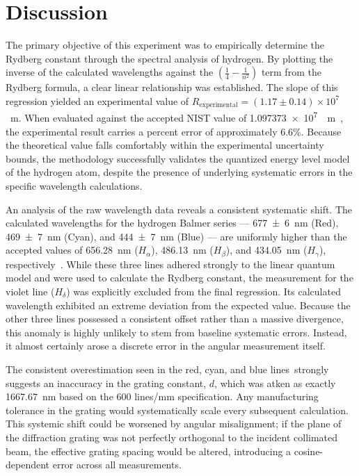 \documentclass[11pt]{article}
\begin{document}
    \newpage
    \section{Discussion}\label{sec:discussion}

        The primary objective of this experiment was to empirically determine
        the Rydberg constant through the spectral analysis of hydrogen.
        By plotting the inverse of the calculated wavelengths against the
        \(\left( \frac{1}{4} - \frac{1}{n^2} \right)\) term from the Rydberg
        formula, a clear linear relationship was established.
        The slope of this regression yielded an experimental value of
        \( R_{\text{experimental}} = (1.17 \pm 0.14) \times 10^7\)
        \si{\per\meter}.
        When evaluated against the accepted NIST value of
        \SI{1.097373e7}{\per\meter}~\cite{nist_rydberg}, the experimental
        result carries a percent error of approximately 6.6\%.
        Because the theoretical value falls comfortably within the
        experimental uncertainty bounds, the methodology successfully
        validates the quantized energy level model of the hydrogen atom,
        despite the presence of underlying systematic errors in the specific
        wavelength calculations.

        An analysis of the raw wavelength data reveals a consistent systematic
        shift.
        The calculated wavelengths for the hydrogen Balmer series ---
        \SI{677 \pm 6}{\nano\meter} (Red), \SI{469 \pm 7}{\nano\meter} (Cyan),
        and \SI{444 \pm 7}{\nano\meter} (Blue) --- are uniformly higher than
        the accepted values of \SI{656.28}{\nano\meter} (\( H_{\alpha} \)),
        \SI{486.13}{\nano\meter} (\( H_{\beta} \)), and
        \SI{434.05}{\nano\meter} (\( H_{\gamma} \)),
        respectively~\cite{nist_hydrogen}.
        While these three lines adhered strongly to the linear quantum model
        and were used to calculate the Rydberg constant, the measurement for
        the violet line (\( H_{\delta} \)) was explicitly excluded from the
        final regression.
        Its calculated wavelength exhibited an extreme deviation from the
        expected value.
        Because the other three lines possessed a consistent offset rather
        than a massive divergence, this anomaly is highly unlikely to stem
        from baseline systematic errors.
        Instead, it almost certainly arose a discrete error in the angular
        measurement itself.

        The consistent overestimation seen in the red, cyan, and blue lines\
        strongly suggests an inaccuracy in the grating constant, \( d \),
        which was atken as exactly \SI{1667.67}{\nano\meter} based on the 600
        lines/mm specification.
        Any manufacturing tolerance in the grating would systematically scale
        every subsequent calculation.
        This systemic shift could be worsened by angular misalignment; if the
        plane of the diffraction grating was not perfectly orthogonal to the
        incident collimated beam, the effective grating spacing would be
        altered, introducing a cosine-dependent error across all measurements.
\end{document}
